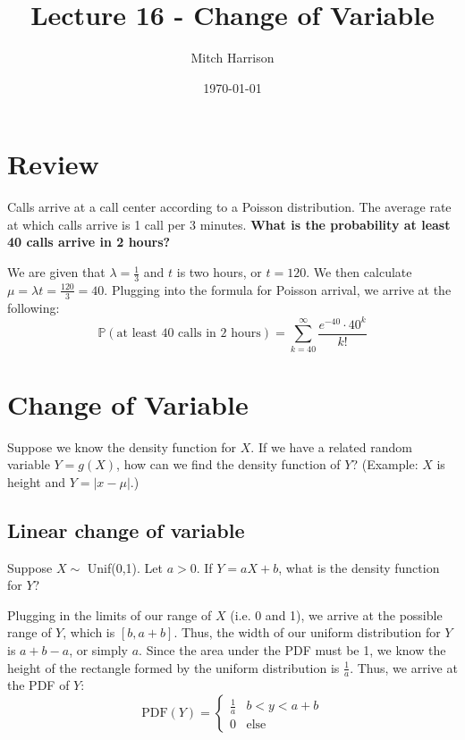 \documentclass[titlepage, 12pt, leqno]{article}
\title{\Huge{Lecture 16 - Change of Variable}}
\author{\large{Mitch Harrison}}
\date{\today}
\begin{document}
\setlength{\parskip}{1\baselineskip}
\setlength{\parindent}{15pt}
\maketitle
\tableofcontents
\newpage


\section{Review}

\begin{ex}
    Calls arrive at a call center according to a Poisson distribution. The
    average rate at which calls arrive is 1 call per 3 minutes. \textbf{What is
    the probability at least 40 calls arrive in 2 hours?}
    \vspace{10px}
    
    We are given that $\lambda = \frac{1}{3}$ and $t$ is two hours, or $t=120$.
    We then calculate $\mu = \lambda t = \frac{120}{3} = 40$. Plugging into the 
    formula for Poisson arrival, we arrive at the following:
    \[
        \boxed{\mathbb{P}( \text{at least 40 calls in 2 hours}) =
        \sum_{k=40}^{\infty}\frac{e^{-40}\cdot40^k}{k!}} 
    \]
\end{ex}

\pagebreak
\section{Change of Variable}
Suppose we know the density function for $X$. If we have a related random variable
$Y = g(X)$, how can we find the density function of $Y$? (Example: $X$ is height
and $Y = |x-\mu|$.)

\subsection{Linear change of variable}
\begin{ex}
    Suppose $X \sim $ Unif(0,1). Let $a > 0$. If $Y = aX + b$, what is the 
    density function for $Y$?
    \vspace{10px}
    
    Plugging in the limits of our range of $X$ (i.e. 0 and 1), we arrive at the
    possible range of $Y$, which is $[b, a+b]$. Thus, the width of our uniform
    distribution for $Y$ is $a+b-a$, or simply $a$. Since the area under the
    PDF must be 1, we know the height of the rectangle formed by the uniform
    distribution is $\frac{1}{a}$. Thus, we arrive at the PDF of $Y$:
    \[
        \boxed{\text{PDF}(Y) = 
        \begin{cases}
            \frac{1}{a} & b<y<a+b \\
            0 & \text{else}
        \end{cases}}
    \]
\end{ex}
\end{document}
